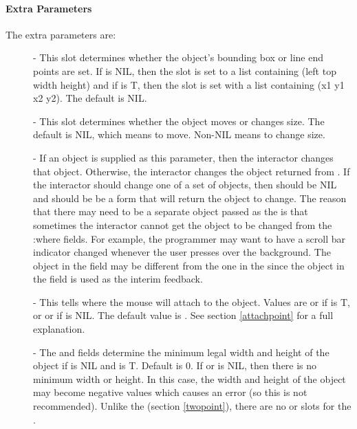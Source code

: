 \paragraph{Extra Parameters}

The extra parameters are:
\begin{description}
\item[] 
- This slot determines whether the object's bounding box or line end points
are set.  If  is NIL, then the  slot is set to a list
containing (left top width height) and if  is T, then the
 slot is set with a list containing (x1 y1 x2 y2).
The default is NIL.

\item[] 
- This slot determines whether the
object moves or changes size.  The
default is NIL, which means to move.  Non-NIL means to change size.

\item[] 
- If an object is supplied as this parameter, then the interactor changes
that object.  Otherwise, the interactor changes the object returned from
.  If the interactor should
change one of a set of objects, then  should be NIL and
 should be be a form that will return the object to change.
The reason that there may need to be a separate object passed
as the 
is that sometimes the interactor cannot get the object to be changed
from the :where fields.  For example, the programmer may want to have a
scroll bar indicator changed whenever the user presses over the background.
The object in the  field may be
different from the one in the  since the object in the
 field is used as the interim feedback.

\item[] 
- This tells where the mouse will attach to the object.  Values are
 or  if  is T, or  or  if  is NIL.
The default value is .
See section \ref{attachpoint} for a full explanation.

\item[] 
- The  and  fields determine the minimum
legal width and height of the object if  is NIL and
 is T.
Default is 0.  If  or  is NIL, then there is no
minimum width or height.  In this case, the width and height of the object
may become negative values which causes an error (so this is not recommended).
Unlike the  (section \ref{twopoint}),
there are no  or  slots for
the .


\end{description}

